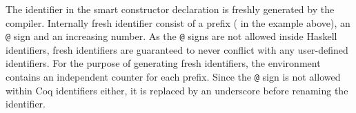 The identifier  in the smart constructor declaration is freshly generated by the compiler.
Internally fresh identifier consist of a prefix ( in the example above), an \texttt{@} sign and an increasing number.
As the \texttt{@} signs are not allowed inside Haskell identifiers, fresh identifiers are guaranteed to never conflict with any user-defined identifiers.
For the purpose of generating fresh identifiers, the environment contains an independent counter for each prefix.
Since the \texttt{@} sign is not allowed within Coq identifiers either, it is replaced by an underscore before renaming the identifier.
